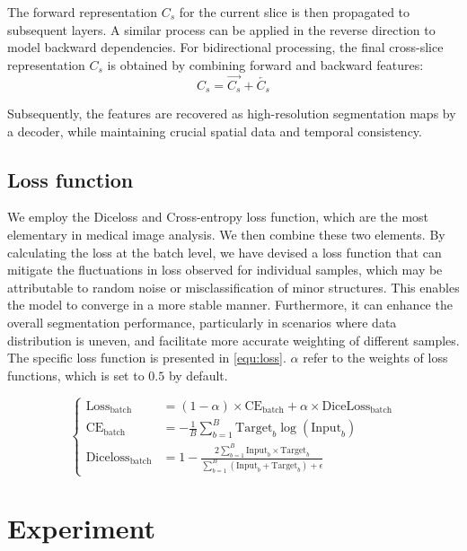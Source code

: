 \documentclass[AMA,Times1COL]{WileyNJDv5} %
\begin{document}
The forward representation \( C_s \) for the current slice is then propagated to subsequent layers. A similar process can be applied in the reverse direction to model backward dependencies. For bidirectional processing, the final cross-slice representation \( C_s \) is obtained by combining forward and backward features: 
\begin{equation}
   C_s = \overrightarrow{C_s} + \overleftarrow{C_s} 
\end{equation}

Subsequently, the features are recovered as high-resolution segmentation maps by a decoder, while maintaining crucial spatial data and temporal consistency. 

\subsection{Loss function}
We employ the Diceloss and Cross-entropy loss function, which are the most elementary in medical image analysis. We then combine these two elements. By calculating the loss at the batch level, we have devised a loss function that can mitigate the fluctuations in loss observed for individual samples, which may be attributable to random noise or misclassification of minor structures. This enables the model to converge in a more stable manner. Furthermore, it can enhance the overall segmentation performance, particularly in scenarios where data distribution is uneven, and facilitate more accurate weighting of different samples. The specific loss function is presented in \eqref{equ:loss}. $\alpha$ refer to the weights of loss functions, which is set to $0.5$ by default.

\begin{equation}
\label{equ:loss}
\left\{
\begin{aligned}
\text{Loss}_{\text{batch}} &= (1-\alpha)\times\text{CE}_{\text{batch}}+\alpha\times\text{DiceLoss}_{\text{batch}} \\
\mathrm{CE}_{\mathrm{batch}} &= -\frac{1}{B}\sum_{b=1}^{B}\text{Target}_{b}\log(\text{Input}_{b}) \\
\mathrm{Diceloss}_{\mathrm{batch}} &= 1-\frac{2\sum_{b=1}^{B}\mathrm{Input}_{b}^{}\times\mathrm{Target}_{b}^{}}{\sum_{b=1}^{B}\left(\mathrm{Input}_{b}^{}+\mathrm{Target}_{b}^{}\right)+\epsilon}
\end{aligned}
\right.
\end{equation}

\section{Experiment}
\end{document}
